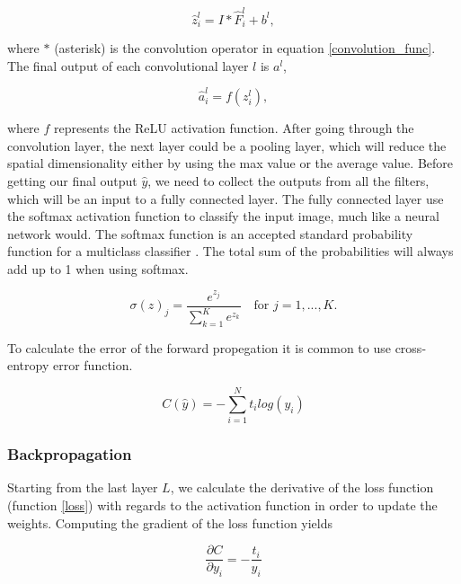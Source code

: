 \documentclass[english, a4paper]{report}
\begin{document}
\begin{equation}
    \hat{z}_i^l = I * \hat{F}_i^l + b^l, 
\end{equation}

where $*$ (asterisk) is the convolution operator in equation \ref{convolution_func}. The final output of each convolutional layer $l$ is $a^l$,

\begin{equation}
    \hat{a}_i^l = f(z_i^l), 
\end{equation}

where $f$ represents the ReLU activation function. After going through the convolution layer, the next layer could be a pooling layer, which will reduce the spatial dimensionality either by using the max value or the average value.
Before getting our final output $\hat{y}$, we need to collect the outputs from all the filters, which will be an input to a fully connected layer. 
The fully connected layer use the softmax activation function to classify the input image, much like a neural network would. The softmax function is an accepted standard probability function for a multiclass classifier \cite{NotesBackpropagation16}. The total sum of the probabilities will always add up to 1 when using softmax. 

\begin{equation} %
  \sigma(z)_j = \frac{e^{z_j}}{\sum_{k=1}^{K} e^{z_k}} \quad \text{for } j = 1, ..., K.
  \label{softmax}
\end{equation}

To calculate the error of the forward propegation it is common to use cross-entropy error function.

\begin{equation} %
  C(\hat{y}) = - \sum_{i=1}^N t_i log(y_i)
  \label{loss}
\end{equation}


\subsubsection{Backpropagation}
Starting from the last layer $L$, we calculate the derivative of the loss function (function \ref{loss}) with regards to the activation function in order to update the weights. Computing the gradient of the loss function yields

\begin{equation}
  \frac{\partial C}{\partial y_i} = - \frac{t_i}{y_i}
\end{equation}
\end{document}

